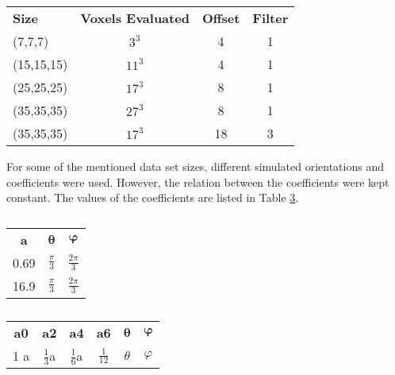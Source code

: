 \begin{table}[h]
    \centering
    \caption{}
    \label{tab:periodic_data_sets_sizes}
    \begin{tabular}{ l c c c }
        \hline
        \textbf{Size} & \textbf{Voxels Evaluated} & \textbf{Offset} & \textbf{Filter} \\
        (7,7,7)       & $3^{3}$                   & 4               & 1               \\
        (15,15,15)    & $11^{3}$                  & 4               & 1               \\
        (25,25,25)    & $17^{3}$                  & 8               & 1               \\
        (35,35,35)    & $27^{3}$                  & 8               & 1               \\
        (35,35,35)    & $17^{3}$                  & 18              & 3               \\
        \hline
    \end{tabular}
\end{table}

For some of the mentioned data set sizes, different simulated orientations and coefficients were used.
However, the relation between the coefficients were kept constant.
The values of the coefficients are listed in Table \ref{tab:periodic_data_sets_coefficients}.

\begin{table}[h]
    \centering
    \caption{}
    \label{tab:periodic_data_sets_coefficients}
    \begin{tabular}{ c c c }
        \hline
        \textbf{a} & $\bm{\theta}$   & $\bm{\varphi}$   \\
        0.69       & $\frac{\pi}{3}$ & $\frac{2\pi}{3}$ \\
        16.9       & $\frac{\pi}{3}$ & $\frac{2\pi}{3}$ \\
        \hline
    \end{tabular}

    \begin{tabular}{ c c c c c c}
        \textbf{a0} & \textbf{a2}    & \textbf{a4}    & \textbf{a6}    & $\bm{\theta}$ & $\bm{\varphi}$ \\
        1 a         & $\frac{1}{3}$a & $\frac{1}{6}$a & $\frac{1}{12}$ & $\theta$      & $\varphi$      \\
        \hline
    \end{tabular}
\end{table}


